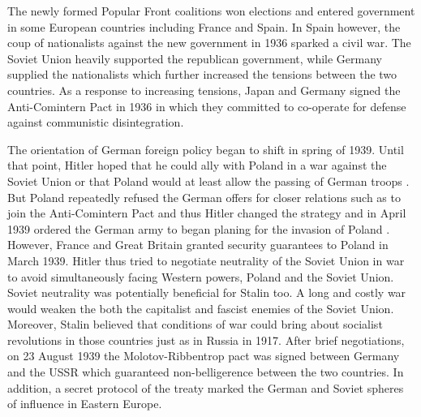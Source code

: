 The newly formed Popular Front coalitions won elections and entered government in some European countries including France and Spain. In Spain however, the coup of nationalists against the new government in 1936 sparked a civil war. The Soviet Union heavily supported the republican government, while Germany supplied the nationalists which further increased the tensions between the two countries. 
As a response to increasing tensions, Japan and Germany signed the Anti-Comintern Pact in 1936 in which they committed to  co-operate for defense against communistic disintegration. 

The orientation of German foreign policy began to shift in spring of 1939.
Until that point, Hitler hoped that he could ally with Poland in a war against the Soviet Union or that Poland would at least allow the passing of German troops \citep[chapter 26]{weinberg_hitlers_2010}. 
But Poland repeatedly refused the German offers for closer relations such as to join the Anti-Comintern Pact and thus Hitler changed the strategy and  in April 1939 ordered the German army to began planing for the invasion of Poland \citep[p. 621]{kotkin_stalin:_2017}. However, France and Great Britain granted security guarantees to Poland in March 1939. 
Hitler thus tried to negotiate neutrality of the Soviet Union in war to avoid simultaneously facing  Western powers, Poland and the Soviet Union.
Soviet neutrality was potentially beneficial for Stalin too. A long and 
costly war would weaken the both the capitalist and fascist enemies of the 
Soviet Union. Moreover, Stalin believed that conditions of war could bring 
about socialist revolutions in those countries just as in Russia in 1917.  
After brief negotiations, on 23 August 1939   the  Molotov-Ribbentrop pact 
was signed between Germany and the USSR which guaranteed non-belligerence 
between the two countries. In addition,  a secret protocol of the treaty marked the German and Soviet spheres of influence in Eastern Europe.




